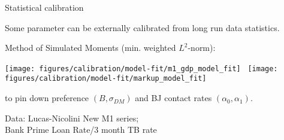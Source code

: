\documentclass[10pt,english,slidetop,compress,
              blue,mathserif,color=option]{beamer}
\theoremstyle{plain}
\theoremstyle{definition}
\begin{document}
%   

\begin{frame}{Statistical calibration}

  Some parameter can be externally calibrated from long run data statistics.

  \bigskip

  Method of Simulated Moments (min. weighted $L^{2}$-norm):
  \begin{center}
    \texttt{[image: figures/calibration/model-fit/m1\_gdp\_model\_fit]}
    \
    \texttt{[image: figures/calibration/model-fit/markup\_model\_fit]}
  \end{center}
  to pin down preference $(B, \sigma_{DM})$ and BJ contact rates $(\alpha_0, \alpha_1)$.

  \bigskip

      {\small\color{gray}
              \hfill Data: Lucas-Nicolini New M1 series; 
              \\ 
              \hfill Bank Prime Loan Rate/3 month TB rate
      }
\end{frame}
\end{document}
